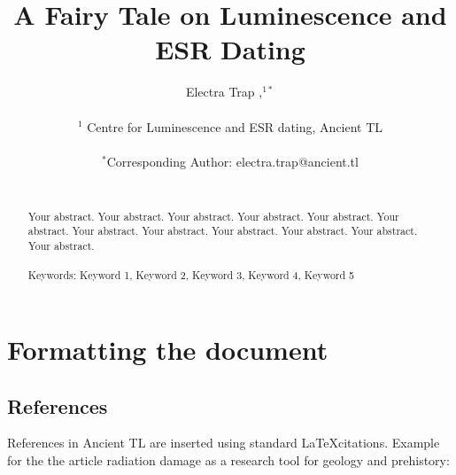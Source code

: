 \documentclass{article}
\begin{document}
\title{A Fairy Tale on Luminescence and ESR Dating}
\author{Electra Trap ,$^{1\ast}$\\
\\
\normalsize{$^{1}$ Centre for Luminescence and ESR dating, Ancient TL}\\
\\
\normalsize{$^\ast$Corresponding Author: electra.trap@ancient.tl}\\
\\
}

%

\maketitle


\begin{abstract}
Your abstract. Your abstract. Your abstract. Your abstract. Your abstract. Your abstract.
Your abstract. Your abstract. Your abstract. Your abstract. Your abstract. Your abstract.
 \\
   \\
   Keywords: Keyword 1, Keyword 2, Keyword 3, Keyword 4, Keyword 5
\end{abstract}


\section{Formatting the document}
\subsection{References}
References in Ancient TL \citep{ATL-website} are inserted using standard \LaTeX citations. 
Example for the the article radiation damage as a research tool for geology and prehistory: \cite{Grogler1958fk}
\end{document}

